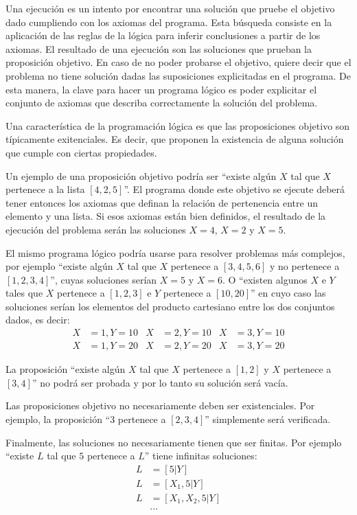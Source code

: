 \documentclass{article}
\begin{document}
Una ejecución es un intento por encontrar una solución que pruebe el objetivo dado cumpliendo con los axiomas del programa. Esta búsqueda consiste en la aplicación de las reglas de la lógica para inferir conclusiones a partir de los axiomas. El resultado de una ejecución son las soluciones que prueban la proposición objetivo. En caso de no poder probarse el objetivo, quiere decir que el problema no tiene solución dadas las suposiciones explicitadas en el programa. De esta manera, la clave para hacer un programa lógico es poder explicitar el conjunto de axiomas que describa correctamente la solución del problema.

Una característica de la programación lógica es que las proposiciones objetivo son típicamente exitenciales. Es decir, que proponen la existencia de alguna solución que cumple con ciertas propiedades. 

Un ejemplo de una proposición objetivo podría ser ``existe algún $X$ tal que $X$ pertenece a la lista $[4,2,5]$''. El programa donde este objetivo se ejecute deberá tener entonces los axiomas que definan la relación de pertenencia entre un elemento y una lista. Si esos axiomas están bien definidos, el resultado de la ejecución del problema serán las soluciones $X=4$, $X=2$ y $X=5$.

El mismo programa lógico podría usarse para resolver problemas más complejos, por ejemplo ``existe algún $X$ tal que $X$ pertenece a $[3,4,5,6]$ y no pertenece a $[1,2,3,4]$'', cuyas soluciones serían $X=5$ y $X=6$. O ``existen algunos $X$ e $Y$ tales que $X$ pertenece a $[1,2,3]$ e $Y$ pertenece a $[10,20]$'' en cuyo caso las soluciones serían los elementos del producto cartesiano entre los dos conjuntos dados, es decir:
\begin{align*}
X& =1,Y=10& X& =2,Y=10& X& =3,Y=10 \\
X& =1,Y=20& X& =2,Y=20& X& =3,Y=20
\end{align*}

La proposición ``existe algún $X$ tal que $X$ pertenece a $[1, 2]$ y $X$ pertenece a $[3, 4]$'' no podrá ser probada y por lo tanto su solución será vacía.

Las proposiciones objetivo no necesariamente deben ser existenciales. Por ejemplo, la proposición ``$3$ pertenece a $[2,3,4]$'' simplemente será verificada.

Finalmente, las soluciones no necesariamente tienen que ser finitas. Por ejemplo ``existe $L$ tal que $5$ pertenece a $L$'' tiene infinitas soluciones:
\begin{align*}
L& =[5|Y] \\
L& =[X_1, 5|Y] \\
L& =[X_1,X_2,5|Y] \\
 & \cdots
\end{align*}
\end{document}
